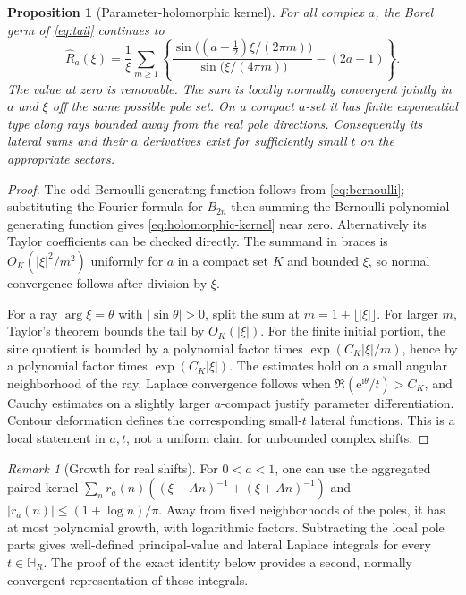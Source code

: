\documentclass[11pt,a4paper]{article}
\numberwithin{equation}{section}
\newtheorem{proposition}[theorem]{Proposition}
\theoremstyle{definition}
\theoremstyle{remark}
\newtheorem{remark}[theorem]{Remark}
\newcommand{\ii}{\mathrm i}
\newcommand{\e}{\mathrm e}
\begin{document}
\begin{proposition}[Parameter-holomorphic kernel]
\label{prop:holomorphic-kernel}
For all complex $a$, the Borel germ of \eqref{eq:tail} continues to
\begin{equation}
 \widehat R_a(\xi)=\frac1\xi\sum_{m\geq1}
 \left\{
 \frac{\sin\big((a-\frac12)\xi/(2\pi m)\big)}
      {\sin\big(\xi/(4\pi m)\big)}-(2a-1)
 \right\}.
 \label{eq:holomorphic-kernel}
\end{equation}
The value at zero is removable. The sum is locally normally convergent
jointly in $a$ and $\xi$ off the same possible pole set. On a compact
$a$-set it has finite exponential type along rays bounded away from the
real pole directions. Consequently its lateral sums and their $a$
derivatives exist for sufficiently small $t$ on the appropriate sectors.
\end{proposition}
\begin{proof}
The odd Bernoulli generating function follows from
\eqref{eq:bernoulli}; substituting the Fourier formula for $B_{2n}$ then
summing the Bernoulli-polynomial generating function gives
\eqref{eq:holomorphic-kernel} near zero. Alternatively its Taylor
coefficients can be checked directly. The summand in braces is
$O_K(|\xi|^2/m^2)$ uniformly for $a$ in a compact set $K$ and bounded
$\xi$, so normal convergence follows after division by $\xi$.

For a ray $\arg\xi=\theta$ with $|\sin\theta|>0$, split the sum at
$m=1+\lfloor|\xi|\rfloor$. For larger $m$, Taylor's theorem bounds the
tail by $O_K(|\xi|)$. For the finite initial portion, the sine quotient
is bounded by a polynomial factor times $\exp(C_K|\xi|/m)$, hence by a
polynomial factor times $\exp(C_K|\xi|)$. The estimates hold on a small
angular neighborhood of the ray. Laplace convergence follows when
$\Re(\e^{\ii\theta}/t)>C_K$, and Cauchy estimates on a slightly larger
$a$-compact justify parameter differentiation. Contour deformation
defines the corresponding small-$t$ lateral functions. This is a local
statement in $a,t$, not a uniform claim for unbounded complex shifts.
\end{proof}

\begin{remark}[Growth for real shifts]
For $0<a<1$, one can use the aggregated paired kernel
$\sum_n r_a(n)((\xi-An)^{-1}+(\xi+An)^{-1})$ and
$|r_a(n)|\leq(1+\log n)/\pi$. Away from fixed neighborhoods of the poles,
it has at most polynomial growth, with logarithmic factors. Subtracting
the local pole parts gives well-defined principal-value and lateral
Laplace integrals for every $t\in\mathbb H_R$. The proof of the exact
identity below provides a second, normally convergent representation of
these integrals.
\end{remark}
\end{document}
